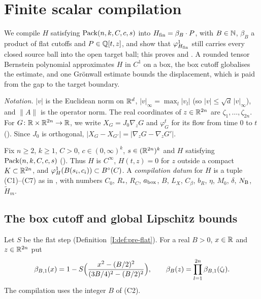 \section{Finite scalar compilation}\label{sec:cpl}

\begingroup\sloppy

We compile $H$ satisfying $\mathrm{Pack}(n,k,C,c,s)$ into $H_{\mathrm{fin}}=\beta_B\cdot P$, with $B\in\mathbb{N}$, $\beta_B$ a product of flat cutoffs and $P\in\mathbb{Q}[t,z]$, and show that $\varphi^1_{H_{\mathrm{fin}}}$ still carries every closed source ball into the open target ball; this proves  and . A rounded tensor Bernstein polynomial approximates $H$ in $C^1$ on a box, the box cutoff globalises the estimate, and one Gr\"onwall estimate bounds the displacement, which is paid from the gap to the target boundary.

\emph{Notation.} $|v|$ is the Euclidean norm on $\mathbb{R}^d$, $|v|_\infty=\max_l|v_l|$ (so $|v|\le\sqrt d\,|v|_\infty$), and $\|A\|$ is the operator norm. The real coordinates of $z\in\mathbb{R}^{2n}$ are $\zeta_1,\dots,\zeta_{2n}$. For $G\colon\mathbb{R}\times\mathbb{R}^{2n}\to\mathbb{R}$, we write $X_G=J_0\nabla_zG$ and $\varphi^t_G$ for its flow from time $0$ to $t$ (). Since $J_0$ is orthogonal, $|X_G-X_{G'}|=|\nabla_zG-\nabla_zG'|$.

Fix $n\ge2$, $k\ge1$, $C>0$, $c\in(0,\infty)^k$, $s\in(\mathbb{R}^{2n})^k$ and $H$ satisfying $\mathrm{Pack}(n,k,C,c,s)$ (). Thus $H$ is $C^\infty$, $H(t,z)=0$ for $z$ outside a compact $K\subset\mathbb{R}^{2n}$, and $\varphi^1_H(B(s_i,c_i))\subset B^{\circ}(C)$. A \emph{compilation datum} for $H$ is a tuple (C1)--(C7) as in , with numbers $C_0$, $R_*$, $R_C$, $a_{\rm box}$, $B$, $L_X$, $C_\beta$, $b_R$, $\eta$, $M_0$, $\delta$, $N_{\rm B}$, $\tilde H_m$.

\subsection{The box cutoff and global Lipschitz bounds}\label{sec:cpl-box}

\begin{definition}\label{def:cpl-box}
Let $S$ be the flat step (Definition~\ref{I:def:pre-flat}). For a real $B>0$, $x\in\mathbb{R}$ and $z\in\mathbb{R}^{2n}$ put
\[
 \beta_{B,1}(x)=1-S\Bigl(\frac{x^2-(B/2)^2}{(3B/4)^2-(B/2)^2}\Bigr),\qquad
 \beta_B(z)=\prod_{l=1}^{2n}\beta_{B,1}(\zeta_l).
\]
The compilation uses the integer $B$ of (C2).
\end{definition}

